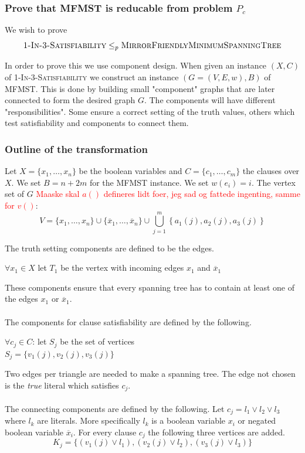 \documentclass[12pt]{report}
\begin{document}
\subsubsection{Prove that MFMST is reducable from problem $P_c$}
We wish to prove $$\textsc{1-In-3-Satisfiability} \leq_p \textsc{MirrorFriendlyMinimumSpanningTree}$$

In order to prove this we use component design. When given an instance $(X,C)$ of \textsc{1-In-3-Satisfiability} we construct an instance $(G = (V, E,w),B)$ of MFMST. This is done by building small "component" graphs that are later connected to form the desired graph $G$. The components will have different "responsibilities". Some ensure a correct setting of the truth values, others which test satisfiability and components to connect them.

\subsubsection{Outline of the transformation}
Let $X = \{x_1,\dots,x_n\}$ be the boolean variables and $C = \{c_1,\dots,c_m\}$ the clauses over $X$. We set $B = n + 2m$ for the MFMST instance. We set $w(e_i) = i$. The vertex set of $G$ \textcolor{red}{Maaske skal $a()$ defineres lidt foer, jeg sad og fattede ingenting, samme for $v()$}:
$$V = \{x_1,\dots,x_n\} \cup \{\overline{x}_1,\dots,\overline{x}_n\} \cup \bigcup_{j=1}^{m}{\left\{a_1(j),a_2(j),a_3(j)\right\}}$$

The truth setting components are defined to be the edges.
\begin{center}
	$\forall x_1 \in X$ let $T_1$ be the vertex with incoming edges $x_1$ and $\overline{x}_1$
\end{center}
These components ensure that every spanning tree has to contain at least one of the edges $x_1$ or $\overline{x}_1$.\\
\\
The components for clause satisfiability are defined by the following.
\begin{center}
	$\forall c_j \in C$: let $S_j$ be the set of vertices\\
	$S_j  = \{v_1(j),v_2(j),v_3(j)\}$
\end{center}
Two edges per triangle are needed to make a spanning tree. The edge not chosen is the \emph{true} literal which satisfies $c_j$.\\
\\
The connecting components are defined by the following. Let $c_j = l_1 \vee l_2 \vee l_3$ where $l_k$ are literals. More specifically $l_k$ is a boolean variable $x_i$ or negated boolean variable $\overline{x}_i$. For every clause $c_j$ the following three vertices are added.
$$K_j = \{(v_1(j) \vee l_1), (v_2(j) \vee l_2), (v_3(j) \vee l_3)\}$$
\end{document}
